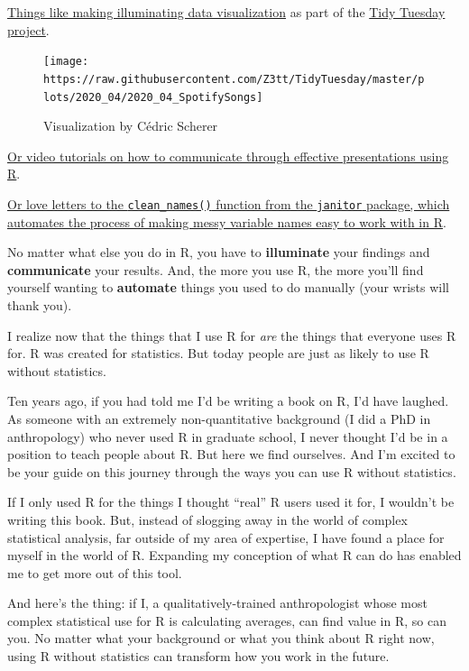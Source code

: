 \documentclass[
]{book}
\begin{document}
\href{https://twitter.com/CedScherer/status/1220843943224578050}{Things like making illuminating data visualization} as part of the \href{https://github.com/rfordatascience/tidytuesday}{Tidy Tuesday project}.

\begin{figure}
\texttt{[image: https://raw.githubusercontent.com/Z3tt/TidyTuesday/master/plots/2020\_04/2020\_04\_SpotifySongs]} \caption{Visualization by Cédric Scherer}\label{fig:unnamed-chunk-6}
\end{figure}

\href{https://twitter.com/spcanelon/status/1424932510065209348}{Or video tutorials on how to communicate through effective presentations using R}.

\href{https://twitter.com/WeAreRLadies/status/1228049014601342976}{Or love letters to the \texttt{clean\_names()} function from the \texttt{janitor} package, which automates the process of making messy variable names easy to work with in R}.

No matter what else you do in R, you have to \textbf{illuminate} your findings and \textbf{communicate} your results. And, the more you use R, the more you'll find yourself wanting to \textbf{automate} things you used to do manually (your wrists will thank you).

I realize now that the things that I use R for \emph{are} the things that everyone uses R for. R was created for statistics. But today people are just as likely to use R without statistics.

Ten years ago, if you had told me I'd be writing a book on R, I'd have laughed. As someone with an extremely non-quantitative background (I did a PhD in anthropology) who never used R in graduate school, I never thought I'd be in a position to teach people about R. But here we find ourselves. And I'm excited to be your guide on this journey through the ways you can use R without statistics.

If I only used R for the things I thought ``real'' R users used it for, I wouldn't be writing this book. But, instead of slogging away in the world of complex statistical analysis, far outside of my area of expertise, I have found a place for myself in the world of R. Expanding my conception of what R can do has enabled me to get more out of this tool.

And here's the thing: if I, a qualitatively-trained anthropologist whose most complex statistical use for R is calculating averages, can find value in R, so can you. No matter what your background or what you think about R right now, using R without statistics can transform how you work in the future.
\end{document}
